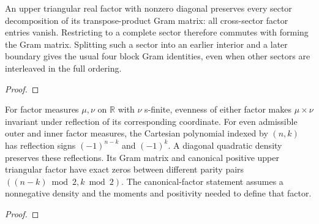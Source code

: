 \begin{supporting}
\begin{theorem}
\label{thm:gram-factor-sectors}
\leanok
An upper triangular real factor with nonzero diagonal preserves every sector decomposition of its transpose-product Gram matrix: all cross-sector factor entries vanish. Restricting to a complete sector therefore commutes with forming the Gram matrix. Splitting such a sector into an earlier interior and a later boundary gives the usual four block Gram identities, even when other sectors are interleaved in the full ordering.
\end{theorem}
\begin{proof}
\leanok
\end{proof}
\end{supporting}


\begin{theorem}
\label{thm:cartesian-quadratic-parity}
\leanok
For factor measures $\mu,\nu$ on $\mathbb R$ with $\nu$ s-finite, evenness of either factor makes $\mu\times\nu$ invariant under reflection of its corresponding coordinate.
For even admissible outer and inner factor measures, the Cartesian polynomial indexed by $(n,k)$ has reflection signs $(-1)^{n-k}$ and $(-1)^k$. A diagonal quadratic density preserves these reflections. Its Gram matrix and canonical positive upper triangular factor have exact zeros between different parity pairs $((n-k)\bmod2,k\bmod2)$. The canonical-factor statement assumes a nonnegative density and the moments and positivity needed to define that factor.
\end{theorem}
\begin{proof}
\leanok
\end{proof}

